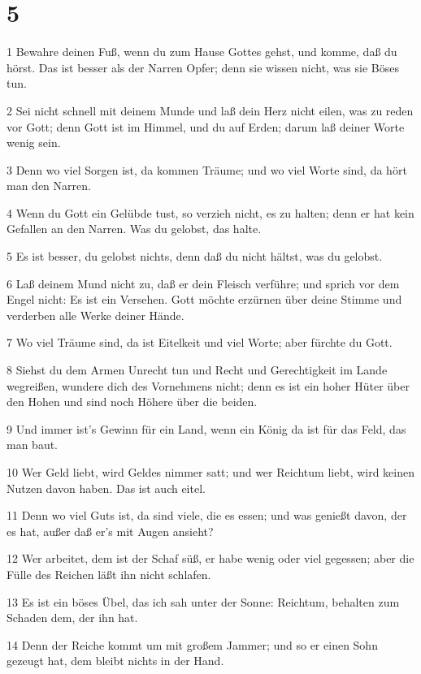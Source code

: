\chapter{5}

\par 1 Bewahre deinen Fuß, wenn du zum Hause Gottes gehst, und komme, daß du hörst. Das ist besser als der Narren Opfer; denn sie wissen nicht, was sie Böses tun.
\par 2 Sei nicht schnell mit deinem Munde und laß dein Herz nicht eilen, was zu reden vor Gott; denn Gott ist im Himmel, und du auf Erden; darum laß deiner Worte wenig sein.
\par 3 Denn wo viel Sorgen ist, da kommen Träume; und wo viel Worte sind, da hört man den Narren.
\par 4 Wenn du Gott ein Gelübde tust, so verzieh nicht, es zu halten; denn er hat kein Gefallen an den Narren. Was du gelobst, das halte.
\par 5 Es ist besser, du gelobst nichts, denn daß du nicht hältst, was du gelobst.
\par 6 Laß deinem Mund nicht zu, daß er dein Fleisch verführe; und sprich vor dem Engel nicht: Es ist ein Versehen. Gott möchte erzürnen über deine Stimme und verderben alle Werke deiner Hände.
\par 7 Wo viel Träume sind, da ist Eitelkeit und viel Worte; aber fürchte du Gott.
\par 8 Siehst du dem Armen Unrecht tun und Recht und Gerechtigkeit im Lande wegreißen, wundere dich des Vornehmens nicht; denn es ist ein hoher Hüter über den Hohen und sind noch Höhere über die beiden.
\par 9 Und immer ist's Gewinn für ein Land, wenn ein König da ist für das Feld, das man baut.
\par 10 Wer Geld liebt, wird Geldes nimmer satt; und wer Reichtum liebt, wird keinen Nutzen davon haben. Das ist auch eitel.
\par 11 Denn wo viel Guts ist, da sind viele, die es essen; und was genießt davon, der es hat, außer daß er's mit Augen ansieht?
\par 12 Wer arbeitet, dem ist der Schaf süß, er habe wenig oder viel gegessen; aber die Fülle des Reichen läßt ihn nicht schlafen.
\par 13 Es ist ein böses Übel, das ich sah unter der Sonne: Reichtum, behalten zum Schaden dem, der ihn hat.
\par 14 Denn der Reiche kommt um mit großem Jammer; und so er einen Sohn gezeugt hat, dem bleibt nichts in der Hand.
